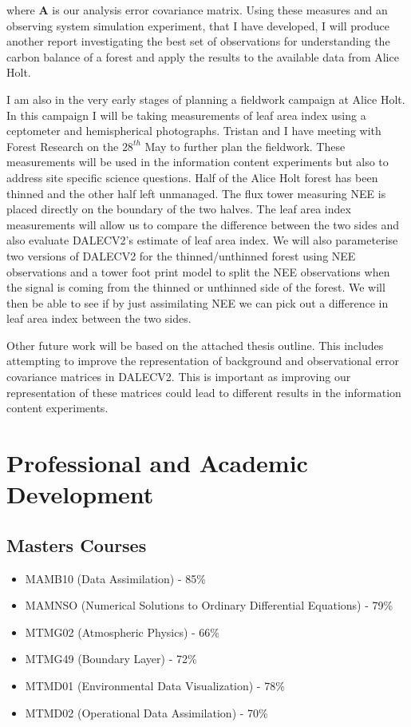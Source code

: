 \documentclass[11pt]{article}
\begin{document}
where $\textbf{A}$ is our analysis error covariance matrix. Using these measures and an observing system simulation experiment, that I have developed, I will produce another report investigating the best set of observations for understanding the carbon balance of a forest and apply the results to the available data from Alice Holt. 

I am also in the very early stages of planning a fieldwork campaign at Alice Holt. In this campaign I will be taking measurements of leaf area index using a ceptometer and hemispherical photographs. Tristan and I have meeting with Forest Research on the $28^{th}$ May to further plan the fieldwork. These measurements will be used in the information content experiments but also to address site specific science questions. Half of the Alice Holt forest has been thinned and the other half left unmanaged.  The flux tower measuring NEE is placed directly on the boundary of the two halves. The leaf area index measurements will allow us to compare the difference between the two sides and also evaluate DALECV2's estimate of leaf area index. We will also parameterise two versions of DALECV2 for the thinned/unthinned forest using NEE observations and a tower foot print model to split the NEE observations when the signal is coming from the thinned or unthinned side of the forest. We will then be able to see if by just assimilating NEE we can pick out a difference in leaf area index between the two sides.

Other future work will be based on the attached thesis outline. This includes attempting to improve the representation of background and observational error covariance matrices in DALECV2. This is important as improving our representation of these matrices could lead to different results in the information content experiments.  



\section{Professional and Academic Development}

\subsection{Masters Courses}
\begin{itemize}
\item MAMB10 (Data Assimilation) - 85\%
\item MAMNSO (Numerical Solutions to Ordinary Differential Equations) - 79\%
\item MTMG02 (Atmospheric Physics) - 66\%
\item MTMG49 (Boundary Layer) - 72\%
\item MTMD01 (Environmental Data Visualization) - 78\%
\item MTMD02 (Operational Data Assimilation) - 70\%
\end{itemize}
\end{document}
